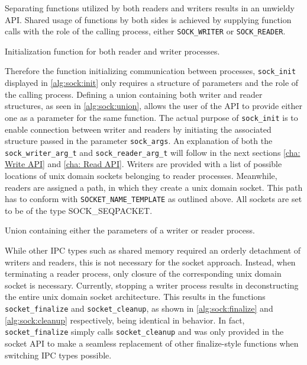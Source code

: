 Separating functions utilized by both readers and writers results in an unwieldy \ac{API}.
Shared usage of functions by both sides is achieved by supplying function calls with the role of the calling process, either \texttt{SOCK\_WRITER} or \texttt{SOCK\_READER}.

\begin{algorithm}[h!]
    
    \caption[Socket: Socket initialization]{Initialization function for both reader and writer processes.}
    \label{alg:sock:init}
\end{algorithm}

Therefore the function initializing communication between processes, \texttt{sock\_init} displayed in \ref{alg:sock:init} only requires a structure of parameters and the role of the calling process.
Defining a union containing both writer and reader structures, as seen in \ref{alg:sock:union}, allows the user of the \ac{API} to provide either one as a parameter for the same function.
The actual purpose of \texttt{sock\_init} is to enable connection between writer and readers by initiating the associated structure passed in the parameter \texttt{sock\_args}.
An explanation of both the \texttt{sock\_writer\_arg\_t} and \texttt{sock\_reader\_arg\_t} will follow in the next sections \ref{cha: Write API} and \ref{cha: Read API}.
Writers are provided with a list of possible locations of unix domain sockets belonging to reader processes.
Meanwhile, readers are assigned a path, in which they create a unix domain socket.
This path has to conform with \texttt{SOCKET\_NAME\_TEMPLATE} as outlined above.
All sockets are set to be of the type SOCK\_SEQPACKET.

\begin{algorithm}[h!]
    
    \caption[Socket: Union for flexible function calling]{Union containing either the parameters of a writer or reader process.}
    \label{alg:sock:union}
\end{algorithm}

While other \ac{IPC} types such as shared memory required an orderly detachment of writers and readers, this is not necessary for the socket approach.
Instead, when terminating a reader process, only closure of the corresponding unix domain socket is necessary.
Currently, stopping a writer process results in deconstructing the entire unix domain socket architecture.
This results in the functions \texttt{socket\_finalize} and \texttt{socket\_cleanup}, as shown in \ref{alg:sock:finalize} and \ref{alg:sock:cleanup} respectively, being identical in behavior.
In fact, \texttt{socket\_finalize} simply calls \texttt{socket\_cleanup} and was only provided in the socket \ac{API} to make a seamless replacement of other finalize-style functions when switching \ac{IPC} types possible.

